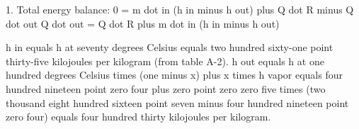 1. Total energy balance:  
0 = m dot in (h in minus h out) plus Q dot R minus Q dot out  
Q dot out = Q dot R plus m dot in (h in minus h out)  

h in equals h at seventy degrees Celsius equals two hundred sixty-one point thirty-five kilojoules per kilogram (from table A-2).  
h out equals h at one hundred degrees Celsius times (one minus x) plus x times h vapor equals four hundred nineteen point zero four plus zero point zero zero five times (two thousand eight hundred sixteen point seven minus four hundred nineteen point zero four) equals four hundred thirty kilojoules per kilogram.